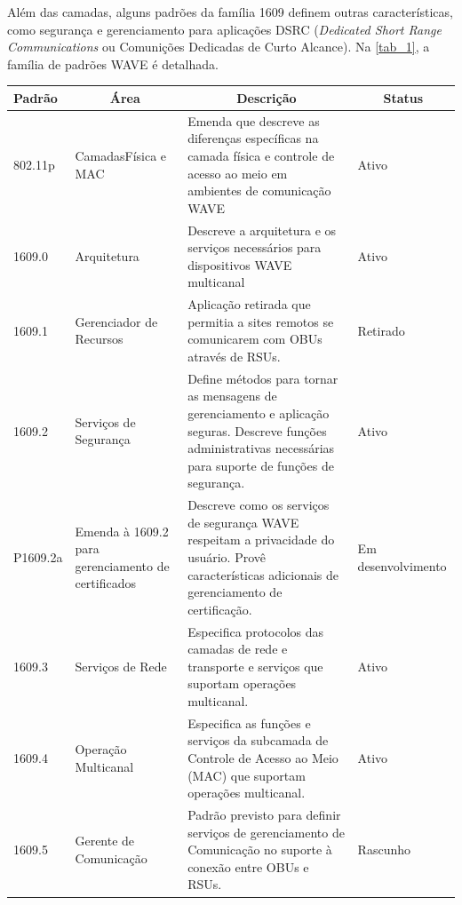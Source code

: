 \documentclass[
12pt,				%
openright,			%
oneside,			%
a4paper,			%
brazil,				%
]{abntex2}
\begin{document}
	\par Além das camadas, alguns padrões da família 1609 definem outras características, como segurança e gerenciamento para aplicações DSRC (\textit{Dedicated Short Range Communications} ou Comunições Dedicadas de Curto Alcance). Na \autoref{tab_1}, a família de padrões WAVE é detalhada. 
	
	\begin{table}[H] %
		\centering
		\renewcommand{\arraystretch}{1.2}
		\begin{tabular}{|p{1.5cm}|p{2.3cm}|p{8.5cm}|p{2cm}|} \hline
			\textbf{Padrão} & \multicolumn{1}{c|}{\textbf{Área}} & \multicolumn{1}{c|}{\textbf{Descrição}} & \multicolumn{1}{c|}{\textbf{Status}} \\ \hline
			802.11p & Camadas\newline Física e MAC & Emenda que descreve as diferenças específicas na camada física e controle de acesso ao meio em ambientes de comunicação WAVE & Ativo \\ \hline
			1609.0 & Arquitetura & Descreve a arquitetura e os serviços necessários para dispositivos WAVE multicanal & Ativo \\ \hline
			1609.1 & Gerenciador de Recursos & Aplicação retirada que permitia a sites remotos se comunicarem com OBUs através de RSUs. & Retirado \\ \hline
			1609.2 & Serviços de Segurança & Define métodos para tornar as mensagens de gerenciamento e aplicação seguras. Descreve funções administrativas necessárias para suporte de funções de segurança. & Ativo \\ \hline
			P1609.2a & Emenda à 1609.2 para gerenciamento de certificados & Descreve como os serviços de segurança WAVE respeitam a privacidade do usuário. Provê características adicionais de gerenciamento de certificação. & Em desenvolvimento \\ \hline
			1609.3 & Serviços de Rede & Especifica protocolos das camadas de rede e transporte e serviços que suportam operações multicanal. & Ativo \\ \hline
			1609.4 & Operação Multicanal & Especifica as funções e serviços da subcamada de Controle de Acesso ao Meio (MAC) que suportam operações multicanal. & Ativo \\ \hline
			1609.5 & Gerente de Comunicação & Padrão previsto para definir serviços de gerenciamento de Comunicação no suporte à conexão entre OBUs e RSUs. & Rascunho \\ \hline

\end{tabular}
\end{table}
\end{document}
